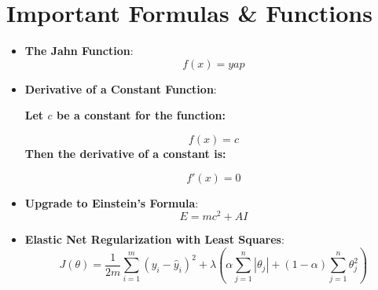 \documentclass[10pt]{article}
\begin{document}
\section*{Important Formulas \& Functions}
\begin{multicols}{2}
\begin{itemize}
    \item \textbf{The Jahn Function}:
    \[
        f(x) = yap
    \]

\item \textbf{Derivative of a Constant Function}:           

    \textbf{    Let \( c \) be a constant for the function:
 }
    
\[
    f(x) = c
\]
\textbf{    Then the derivative of a constant is:
}         
    
\[
    f'(x) = 0
\]

    \item \textbf{Upgrade to Einstein's Formula}:
    \[
    E = mc^2 + AI
    \]

    \item \textbf{Elastic Net Regularization with Least Squares}:
    \[
    J(\theta) = \frac{1}{2m} \sum_{i=1}^{m} (y_i - \hat{y}_i)^2 + \lambda \left( \alpha \sum_{j=1}^{n} |\theta_j| + (1 - \alpha) \sum_{j=1}^{n} \theta_j^2 \right)
    \]

\end{itemize}
\end{multicols}
\end{document}
